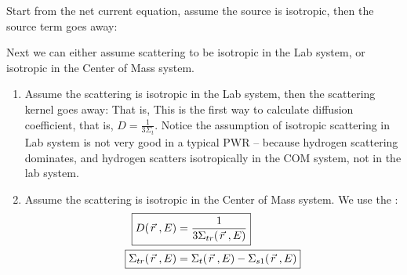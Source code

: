 \documentclass{school-22.211-notes}
\begin{document}
\clearpage
{}
Start from the net current equation, assume the source is isotropic, then the source term goes away:

Next we can either assume scattering to be isotropic in the Lab system, or isotropic in the Center of Mass system. 
\begin{enumerate}
\item Assume the scattering is isotropic in the Lab system, then the scattering kernel goes away:
That is, 
This is the first way to calculate diffusion coefficient, that is, $D = \frac{1}{3 \Sigma_t}$. Notice the assumption of isotropic scattering in Lab system is not very good in a typical PWR -- because hydrogen scattering dominates, and hydrogen scatters isotropically in the COM system, not in the lab system. 


\item Assume the scattering is isotropic in the Center of Mass system. We use the :
\begin{align}
  \Aboxed{ D(\vecr, E) &= \frac{1}{3 \Sigma_{tr} (\vecr, E) } } \\
  \Aboxed{ \Sigma_{tr} (\vecr, E) &= \Sigma_t(\vecr, E) - \Sigma_{s1} (\vecr, E) } 
\end{align} 
\end{enumerate}
\end{document}
